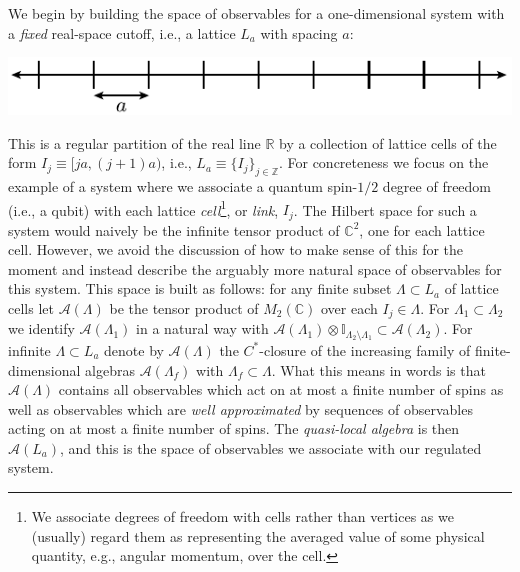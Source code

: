 \documentclass[11pt]{amsart}
\theoremstyle{plain}%
\theoremstyle{definition}
\theoremstyle{remark}
\begin{document}
We begin by building the space of observables for a one-dimensional system with a \emph{fixed} real-space cutoff, i.e., a lattice $L_a$ with spacing $a$: 
\begin{center}
	\includegraphics{lattice.pdf}
\end{center}
This is a regular partition of the real line $\mathbb{R}$ by a collection of lattice cells of the form $I_j \equiv [ja, (j+1)a)$, i.e., $L_a \equiv \{I_j\}_{j\in \mathbb{Z}}$. For concreteness we focus on the example of a system where we associate a quantum spin-$1/2$ degree of freedom (i.e., a qubit) with each lattice \emph{cell}\footnote{We associate degrees of freedom with cells rather than vertices as we (usually) regard them as representing the averaged value of some physical quantity, e.g., angular momentum, over the cell.}, or \emph{link}, $I_j$. The Hilbert space for such a system would naively be the infinite tensor product of $\mathbb{C}^2$, one for each lattice cell. However, we avoid the discussion of how to make sense of this for the moment and instead describe the arguably more natural space of observables for this system. This space is built as follows: for any finite subset $\Lambda \subset L_a$ of lattice cells let $\mathcal{A}(\Lambda)$ be the tensor product of $M_2(\mathbb{C})$ over each $I_j\in \Lambda$. For $\Lambda_1\subset \Lambda_2$ we identify $\mathcal{A}(\Lambda_1)$ in a natural way with $\mathcal{A}(\Lambda_1)\otimes \mathbb{I}_{\Lambda_2\setminus \Lambda_1} \subset \mathcal{A}(\Lambda_2)$. For infinite $\Lambda \subset L_a$ denote by $\mathcal{A}(\Lambda)$ the $C^*$-closure of the increasing family of finite-dimensional algebras $\mathcal{A}(\Lambda_f)$ with $\Lambda_f \subset \Lambda$. What this means in words is that $\mathcal{A}(\Lambda)$ contains all observables which act on at most a finite number of spins as well as observables which are \emph{well approximated} by sequences of observables acting on at most a finite number of spins. The \emph{quasi-local algebra} is then $\mathcal{A}(L_a)$, and this is the space of observables we associate with our regulated system. 
\end{document}
